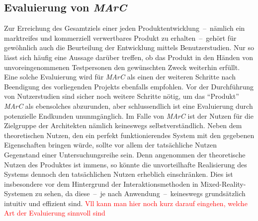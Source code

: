 \subsection{Evaluierung von \emph{MArC}}
Zur Erreichung des Gesamtziels einer jeden Produktentwicklung~--~nämlich ein markt\-rei\-fes und kommerziell verwertbares Produkt zu erhalten~--~gehört für gewöhnlich auch die Beurteilung der Entwicklung mittels Benutzerstudien. Nur so lässt sich häufig eine Aussage darüber treffen, ob das Produkt in den Händen von unvoreingenommenen Testpersonen den gewünschten Zweck weiterhin erfüllt.\\
Eine solche Evaluierung wird für \emph{MArC} als einen der weiteren Schritte nach Beendigung des vorliegenden Projekts ebenfalls empfohlen. Vor der Durchführung von Nutzerstudien sind sicher noch weitere Schritte nötig, um das "`Produkt"' \emph{MArC} als ebensolches abzurunden, aber schlussendlich ist eine Evaluierung durch potenzielle Endkunden ununmgänglich. Im Falle von \emph{MArC} ist der Nutzen für die Zielgruppe der Architekten nämlich keineswegs selbstverständlich. Neben dem theoretischen Nutzen, den ein perfekt funktionierendes System mit den gegebenen Eigenschaften bringen würde, sollte vor allem der tatsächliche Nutzen Gegenstand einer Untersuchungsreihe sein. Denn angenommen der theoretische Nutzen des Produktes ist immens, so könnte die unvorteilhafte Realisierung des Systems dennoch den tatsächlichen Nutzen erheblich einschränken. Dies ist insbesondere vor dem Hintergrund der Interaktionsmethoden in Mixed-Reality-Systemen zu sehen, da diese~--~je nach Anwendung~--~keineswegs grundsätzlich intuitiv und effizient sind. \textcolor{red}{Vll kann man hier noch kurz darauf eingehen, welche Art der Evaluierung sinnvoll sind } 